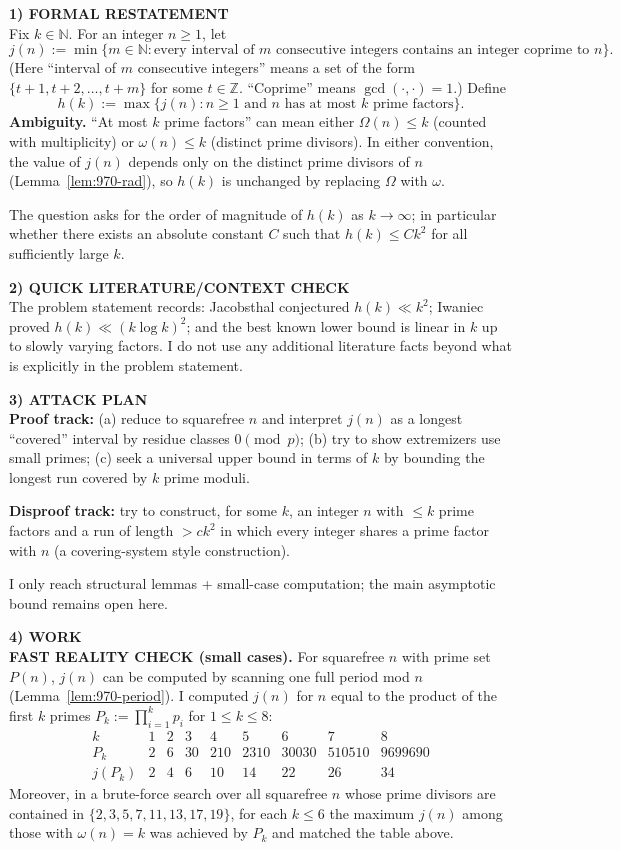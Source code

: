 \medskip
\noindent\textbf{1) FORMAL RESTATEMENT}\\
Fix $k\in\mathbb{N}$. For an integer $n\ge 1$, let
\[
 j(n) := \min\{m\in\mathbb{N}: \text{every interval of $m$ consecutive integers contains an integer coprime to $n$}\}.
\]
(Here ``interval of $m$ consecutive integers'' means a set of the form $\{t+1,t+2,\dots,t+m\}$ for some $t\in\mathbb{Z}$.  ``Coprime'' means $\gcd(\cdot,\cdot)=1$.)
Define
\[
 h(k) := \max\{ j(n): n\ge 1\text{ and $n$ has at most $k$ prime factors}\}.
\]
\textbf{Ambiguity.} ``At most $k$ prime factors'' can mean either $\Omega(n)\le k$ (counted with multiplicity) or $\omega(n)\le k$ (distinct prime divisors).  In either convention, the value of $j(n)$ depends only on the distinct prime divisors of $n$ (Lemma~\ref{lem:970-rad}), so $h(k)$ is unchanged by replacing $\Omega$ with $\omega$.

The question asks for the order of magnitude of $h(k)$ as $k\to\infty$; in particular whether there exists an absolute constant $C$ such that $h(k)\le C k^2$ for all sufficiently large $k$.

\medskip
\noindent\textbf{2) QUICK LITERATURE/CONTEXT CHECK}\\
The problem statement records: Jacobsthal conjectured $h(k)\ll k^2$; Iwaniec proved $h(k)\ll (k\log k)^2$; and the best known lower bound is linear in $k$ up to slowly varying factors.  I do not use any additional literature facts beyond what is explicitly in the problem statement.

\medskip
\noindent\textbf{3) ATTACK PLAN}\\
\textbf{Proof track:} (a) reduce to squarefree $n$ and interpret $j(n)$ as a longest ``covered'' interval by residue classes $0\pmod p$; (b) try to show extremizers use small primes; (c) seek a universal upper bound in terms of $k$ by bounding the longest run covered by $k$ prime moduli.

\textbf{Disproof track:} try to construct, for some $k$, an integer $n$ with $\le k$ prime factors and a run of length $>c k^2$ in which every integer shares a prime factor with $n$ (a covering-system style construction).

I only reach structural lemmas + small-case computation; the main asymptotic bound remains open here.

\medskip
\noindent\textbf{4) WORK}\\
\textbf{FAST REALITY CHECK (small cases).}  For squarefree $n$ with prime set $P(n)$, $j(n)$ can be computed by scanning one full period mod $n$ (Lemma~\ref{lem:970-period}).  I computed $j(n)$ for $n$ equal to the product of the first $k$ primes $P_k:=\prod_{i=1}^k p_i$ for $1\le k\le 8$:
\[
\begin{array}{c|cccccccc}
 k & 1 & 2 & 3 & 4 & 5 & 6 & 7 & 8\\\hline
 P_k & 2 & 6 & 30 & 210 & 2310 & 30030 & 510510 & 9699690\\
 j(P_k) & 2 & 4 & 6 & 10 & 14 & 22 & 26 & 34
\end{array}
\]
Moreover, in a brute-force search over all squarefree $n$ whose prime divisors are contained in $\{2,3,5,7,11,13,17,19\}$, for each $k\le 6$ the maximum $j(n)$ among those with $\omega(n)=k$ was achieved by $P_k$ and matched the table above.

